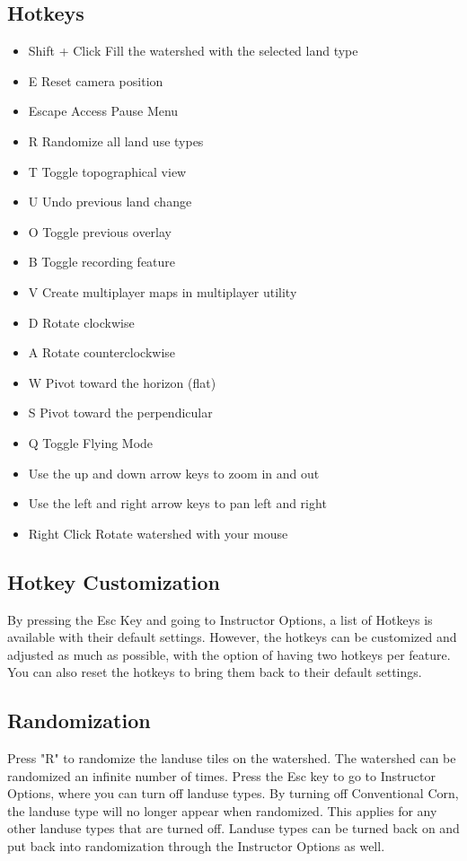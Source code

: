 \documentclass[11pt]{article}
\begin{document}
\subsection{Hotkeys}
\begin{itemize}
\item Shift + Click	Fill the watershed with the selected land type
\item E	Reset camera position
\item Escape	Access Pause Menu
\item R	Randomize all land use types
\item T	Toggle topographical view
\item U	Undo previous land change
\item O	Toggle previous overlay
\item B	Toggle recording feature
\item V	Create multiplayer maps in multiplayer utility
\item D	Rotate clockwise
\item A	Rotate counterclockwise
\item W	Pivot toward the horizon (flat)
\item S	Pivot toward the perpendicular
\item Q	Toggle Flying Mode
\item Use the up and down arrow keys to zoom in and out
\item Use the left and right arrow keys to pan left and right
\item Right Click	Rotate watershed with your mouse
\end{itemize}

\subsection{Hotkey Customization}
By pressing the Esc Key and going to Instructor Options, a list of Hotkeys is available with their default settings. However, the hotkeys can be customized and adjusted as much as possible, with the option of having two hotkeys per feature. You can also reset the hotkeys to bring them back to their default settings. 

\subsection{Randomization}
Press "R" to randomize the landuse tiles on the watershed. The watershed can be randomized an infinite number of times. Press the Esc key to go to Instructor Options, where you can turn off landuse types. By turning off Conventional Corn, the landuse type will no longer appear when randomized. This applies for any other landuse types that are turned off. Landuse types can be turned back on and put back into randomization through the Instructor Options as well. 
\end{document}
